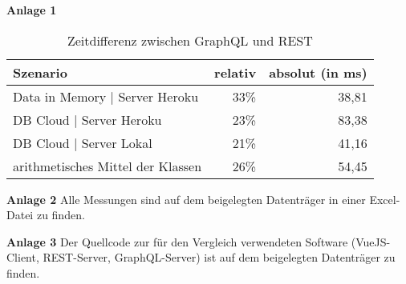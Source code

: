 \noindent\textbf{Anlage 1}
{
\begin{table}[h!]
  \begin{center}
    \caption{Zeitdifferenz zwischen GraphQL und REST}\label{tab:graphql-rest}
    \begin{tabularx}{\linewidth}{Xrr}
      \rowcolor{blue!40!white!50!black!10}\textbf{Szenario} & \textbf{relativ} & \textbf{absolut (in ms)}\\
      \midrule
      Data in Memory | Server Heroku & 33\% & 38,81\\
      DB Cloud | Server Heroku & 23\% & 83,38\\
      DB Cloud | Server Lokal & 21\% & 41,16\\
      \bottomrule
      arithmetisches Mittel der Klassen & 26\% & 54,45\\
    \end{tabularx}
  \end{center}
\end{table}
}
\par
\vspace{1cm}
\noindent\textbf{Anlage 2}
Alle Messungen sind auf dem beigelegten Datenträger in einer Excel-Datei zu finden.
\par
\vspace{1cm}
\noindent\textbf{Anlage 3}
Der Quellcode zur für den Vergleich verwendeten Software (VueJS-Client, REST-Server, GraphQL-Server) ist auf dem beigelegten Datenträger zu finden.
